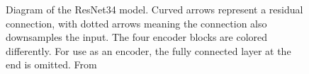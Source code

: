 \begin{figure}[htbp]
    \caption{Diagram of the ResNet34 model. Curved arrows represent a residual connection, with dotted arrows meaning the connection also downsamples the input. The four encoder blocks are colored differently. For use as an encoder, the fully connected layer at the end is omitted. From \cite{heDeepResidualLearning2015}}
    \label{fig:resnet34}
\end{figure}